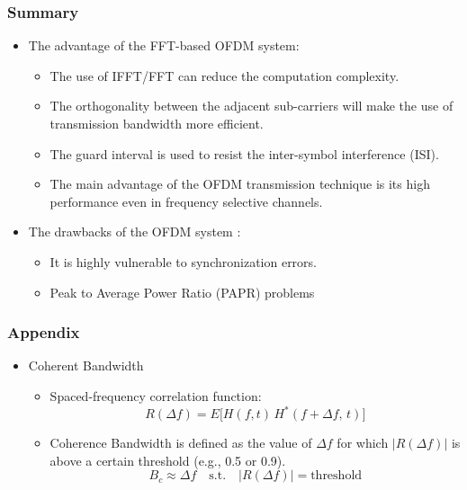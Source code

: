 \documentclass[xcolor=dvipsnames,aspectratio=169]{beamer} %
\def\\{}%
\begin{document}
\begin{frame}
    \frametitle{Summary}
    \begin{itemize}
        \item The advantage of the FFT-based OFDM system:
        \begin{itemize}
            \item The use of IFFT/FFT can reduce the computation complexity.
            \item The orthogonality between the adjacent sub-carriers will make the use of transmission bandwidth more efficient.
            \item The guard interval is used to resist the inter-symbol interference (ISI).
            \item The main advantage of the OFDM transmission technique is its high performance even in frequency selective channels.
        \end{itemize}
    \end{itemize}
    \begin{itemize}
        \item The drawbacks of the OFDM system :
        \begin{itemize}
            \item It is highly vulnerable to synchronization errors.
            \item Peak to Average Power Ratio (PAPR) problems
        \end{itemize}
    \end{itemize}
\end{frame}
\begin{frame}
\frametitle{Appendix}
\begin{itemize}
  \item Coherent Bandwidth\\
  \begin{itemize}
    \item Spaced-frequency correlation function:
    \begin{equation*}
        R(\Delta f) = E\big[H(f,t)\,H^{*}(f+\Delta f,\,t)\big]
    \end{equation*}
    \item Coherence Bandwidth is defined as the value of $\Delta f$ for which $|R(\Delta f)|$ is above a certain threshold (e.g., 0.5 or 0.9).
    \begin{equation*}
    B_c \approx \Delta f \quad \text{s.t.} \quad |R(\Delta f)| = \text{threshold}
    \end{equation*}
  \end{itemize}
\end{itemize}
\end{frame}
\end{document}
